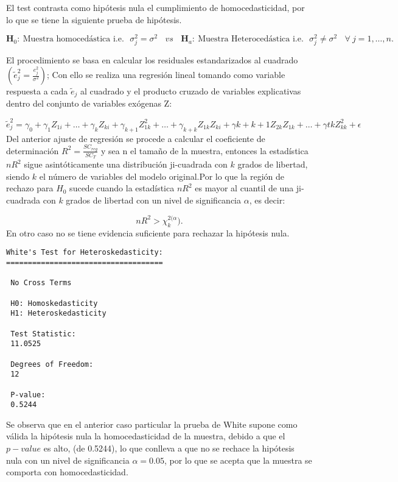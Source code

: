 \documentclass[
  a4paper,
  oneside,
  openany]{book}
\begin{document}
El test contrasta como hipótesis nula el cumplimiento de homocedasticidad, por lo que se tiene la siguiente prueba de hipótesis.

\[\textbf{H}_0: \  \mbox{Muestra homocedástica  i.e.}  \ \ \  \sigma^2_{j}=\sigma^2 \ \ \ \ vs  \ \ \ \
\textbf{H}_a: \  \mbox{Muestra Heterocedástica i.e.}  \ \ \  \sigma^2_{j} \neq \sigma^2  \ \ \ \ \forall  \ j = 1,\ldots,n.\]

El procedimiento se basa en calcular los residuales estandarizados al cuadrado \(\left( \tilde{e}^2_{j}=\frac{e^2_{j}}{\sigma^2}\right)\); Con ello se realiza una regresión lineal tomando como variable respuesta a cada \(\tilde{e}_{j}\) al cuadrado y el producto cruzado de variables explicativas dentro del conjunto de variables exógenas Z:

\[\tilde{e}_{j}^{2}=\gamma_{0}+\gamma_{1}Z_{1i}+ \ldots + \gamma_{k}Z_{ki}+\gamma_{k+1}Z^2_{1k}+\ldots + \gamma_{k+k}Z_{1k}Z_{ki}+\gamma{k+k+1}Z_{2k}Z_{1k}+\ldots + \gamma{tk}Z^2_{kk}+\epsilon\]
Del anterior ajuste de regresión se procede a calcular el coeficiente de determinación \(R^2=\frac{SC_{reg}}{SC_{T}}\) y sea n el tamaño de la muestra, entonces la estadística \(nR^2\) sigue asintóticamente una distribución ji-cuadrada con \(k\) grados de libertad, siendo \(k\) el número de variables del modelo original.Por lo que la región de rechazo para \(H_0\) sucede cuando la estadística \(nR^2\) es mayor al cuantil de una ji-cuadrada con \(k\) grados de libertad con un nivel de significancia \(\alpha\), es decir:

\[nR^2>\chi^{2(\alpha}_{k}).\]
En otro caso no se tiene evidencia suficiente para rechazar la hipótesis nula.

\begin{verbatim}
White's Test for Heteroskedasticity:
==================================== 

 No Cross Terms

 H0: Homoskedasticity
 H1: Heteroskedasticity

 Test Statistic:
 11.0525 

 Degrees of Freedom:
 12 

 P-value:
 0.5244 
\end{verbatim}

Se observa que en el anterior caso particular la prueba de White supone como válida la hipótesis nula la homocedasticidad de la muestra, debido a que el \(p-value\) es alto, (de 0.5244), lo que conlleva a que no se rechace la hipótesis nula con un nivel de significancia \(\alpha=0.05\), por lo que se acepta que la muestra se comporta con homocedasticidad.
\end{document}
